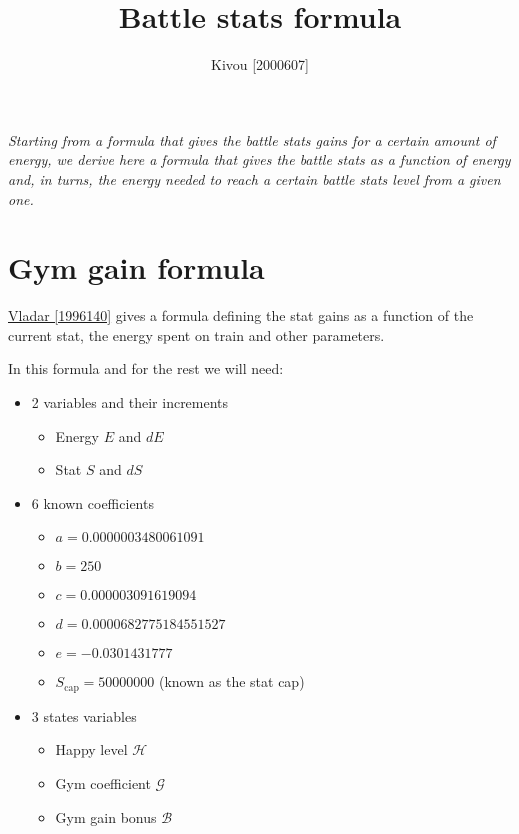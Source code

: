 \documentclass[12pt]{article}
\title{Battle stats formula}
\author{Kivou [2000607]}
\def\happy{\mathcal{H}}
\def\gym{\mathcal{G}}
\def\bonus{\mathcal{B}}
\def\Sc{S_\text{cap}}
\begin{document}
\maketitle
\par{\it Starting from a formula that gives the battle stats gains for a certain amount of energy, we derive here  a formula that gives the battle stats as a function of energy and, in turns, the energy needed to reach a certain battle stats level from a given one.}

\section{Gym gain formula}
\href{https://www.torn.com/forums.php?p=threads&f=61&t=16003284&b=0&a=0&start=0&to=17684755}{Vladar [1996140]} gives a formula defining the stat gains as a function of the current stat, the energy spent on train and other parameters.

\par In this formula and for the rest we will need:
\begin{itemize}
    \item 2 variables and their increments
    \begin{itemize}
        \item Energy $E$ and $dE$
        \item Stat $S$ and $dS$
    \end{itemize}
    \item 6 known coefficients
        \begin{itemize}
            \item $a = 0.0000003480061091$
            \item $b = 250$
            \item $c = 0.000003091619094$
            \item $d = 0.0000682775184551527$
            \item $e = -0.0301431777$
            \item $\Sc = 50000000$ (known as the stat cap)
        \end{itemize}
    \item 3 states variables
    \begin{itemize}
        \item Happy level $\happy$
        \item Gym coefficient $\gym$
        \item Gym gain bonus $\bonus$
    \end{itemize}
\end{itemize}
\end{document}
